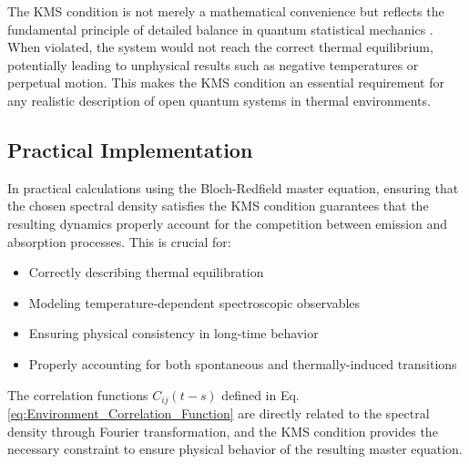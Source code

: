 \noindent The KMS condition is not merely a mathematical convenience but reflects the fundamental principle of detailed balance in quantum statistical mechanics \cite{accardietal2016threenewprinciples}. When violated, the system would not reach the correct thermal equilibrium, potentially leading to unphysical results such as negative temperatures or perpetual motion. This makes the KMS condition an essential requirement for any realistic description of open quantum systems in thermal environments.

\subsection{Practical Implementation}
\label{subsec:practical_implementation}

\noindent In practical calculations using the Bloch-Redfield master equation, ensuring that the chosen spectral density satisfies the KMS condition guarantees that the resulting dynamics properly account for the competition between emission and absorption processes. This is crucial for:

\begin{itemize}
    \item Correctly describing thermal equilibration
    \item Modeling temperature-dependent spectroscopic observables
    \item Ensuring physical consistency in long-time behavior
    \item Properly accounting for both spontaneous and thermally-induced transitions
\end{itemize}

\noindent The correlation functions $C_{ij}(t-s)$ defined in Eq. \eqref{eq:Environment_Correlation_Function} are directly related to the spectral density through Fourier transformation, and the KMS condition provides the necessary constraint to ensure physical behavior of the resulting master equation.